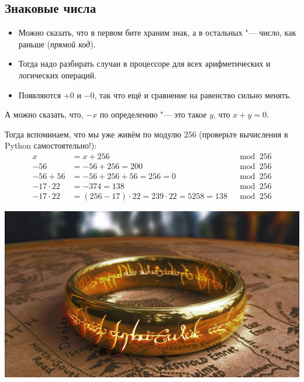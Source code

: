 \subsection{Знаковые числа}

\begin{frame}
\end{frame}

\begin{frame}
	\begin{itemize}
		\item
			Можно сказать, что в первом бите храним знак, а в остальных "--- число, как раньше (\textit{прямой код}).
		\item
			Тогда надо разбирать случаи в процессоре для всех арифметических и логических операций.
		\item
			Появляются $+0$ и $-0$, так что ещё и сравнение на равенство сильно менять.
	\end{itemize}

	А можно сказать, что, $-x$ по определению "--- это такое $y$, что $x+y=0$.

	Тогда вспоминаем, что мы уже живём по модулю 256 (проверьте вычисления в Python самостоятельно!):
	\begin{align*}
		x &= x + 256 &\mod 256 \\
		-56 &= -56 + 256 = 200 &\mod 256 \\
		-56 + 56 &= -56 + 256 + 56 = 256 = 0 &\mod 256 \\
		-17 \cdot 22 &= -374 = 138 &\mod 256 \\
		-17 \cdot 22 &= (256 - 17) \cdot 22 = 239 \cdot 22 = 5258 = 138 &\mod 256
	\end{align*}
\end{frame}

\begin{frame}
	\begin{center}
		\includegraphics[scale=0.3]{one-ring-to-rule.jpg}
	\end{center}
\end{frame}


